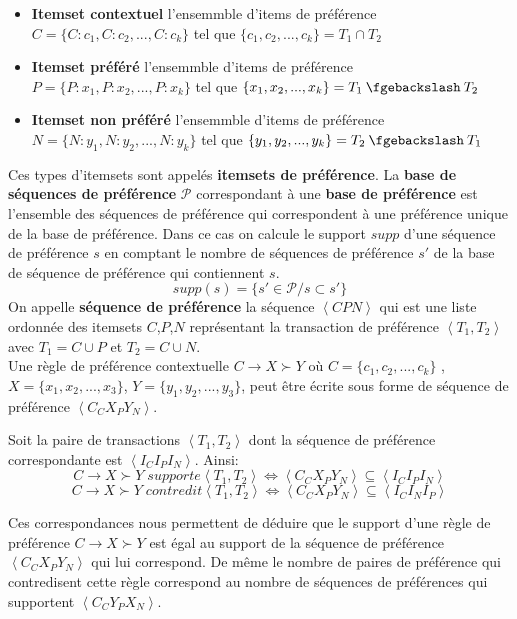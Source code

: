 \documentclass[a4paper,12pt,openany,oneside]{article}
\newcommand{\mysetminus}{\mathbin{\fgebackslash}}
\begin{document}
\begin{itemize}
\item \textbf{Itemset contextuel} l'ensemmble d'items de préférence $C=\{C:c_1,C:c_2,...,C:c_k\}$ tel que $\{c_1,c_2,...,c_k\}= T_1\cap T_2$
\item \textbf{Itemset préféré} l'ensemmble d'items de préférence $P=\{P:x_1,P:x_2,...,P:x_k\}$ tel que $\{x_1,x_2,...,x_k\}= T_1 \mysetminus T_2$
\item \textbf{Itemset non préféré} l'ensemmble d'items de préférence $N=\{N:y_1,N:y_2,...,N:y_k\}$ tel que $\{y_1,y_2,...,y_k\}= T_2\mysetminus T_1$
\end{itemize} 
Ces types d'itemsets sont appelés \textbf{itemsets de préférence}.
La \textbf{base de séquences de préférence} $\mathcal{P}$ correspondant à une \textbf{base de préférence} est l'ensemble des séquences de préférence qui correspondent à une préférence unique de la base de préférence.
Dans ce cas on calcule le support $supp$ d'une séquence de préférence $s$ en comptant le nombre de séquences de préférence $s'$ de la base de séquence de préférence qui contiennent $s$.  
\[
	supp(s)=\{s'\in \mathcal{P}/s\subset s'\}
\]
On appelle \textbf{séquence de préférence} la séquence $\left<CPN\right>$ qui est une liste ordonnée des itemsets $C$,$P$,$N$ représentant la transaction de préférence $\left<T_1,T_2\right>$ avec $T_1=C\cup P$ et $T_2=C\cup N$.\\
Une règle de préférence contextuelle $C\rightarrow X\succ Y$ où $C=\{c_1,c_2,...,c_k\}$ , $X=\{x_1,x_2,...,x_3\}$, $Y=\{y_1,y_2,...,y_3\}$, peut être écrite sous forme de séquence de préférence $\left<C_C X_P Y_N\right>$.


Soit la paire de transactions $\left< T_1,T_2\right>$ dont la séquence de préférence correspondante est $\left<I_C I_P I_N\right>$. Ainsi:
\[
	C\rightarrow X\succ Y\; supporte \left<T_1,T_2\right> \Leftrightarrow  \left<C_C X_P Y_N\right> \subseteq \left<I_C I_P I_N\right>
\]
\[
	C\rightarrow X\succ Y\; contredit \left<T_1,T_2\right> \Leftrightarrow  \left<C_C X_P Y_N\right> \subseteq \left<I_C I_N I_P\right>
\] 


Ces correspondances nous permettent de déduire que le support d'une règle de préférence  $C\rightarrow X\succ Y$ est égal au support de la séquence de préférence $\left<C_C X_P Y_N\right>$ qui lui correspond.
De même le nombre de paires de préférence qui contredisent cette règle correspond au nombre de séquences de préférences qui supportent  $\left<C_C Y_P X_N\right>$.
\end{document}

